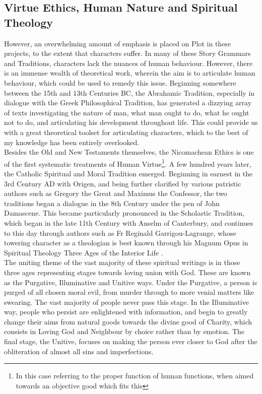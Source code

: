 \documentclass[11pt]{article}
\begin{document}
\subsection{Virtue Ethics, Human Nature and Spiritual Theology}
However, an overwhelming amount of emphasis is placed on Plot in these projects, to the extent that characters suffer. In many of these Story Grammars and Traditions, characters lack the nuances of human behaviour. However, there is an immense wealth of theoretical work, wherein the aim is to articulate human behaviour, which could be used to remedy this issue. Beginning somewhere between the 15th and 13th Centuries BC, the Abrahamic Tradition, especially in dialogue with the Greek Philosophical Tradition, has generated a dizzying array of texts investigating the nature of man, what man ought to do, what he ought not to do, and articulating his development throughout life. This could provide us with a great theoretical toolset for articulating characters, which to the best of my knowledge has been entirely overlooked. \\

Besides the Old and New Testaments themselves, the Nicomachean Ethics \cite{340BCEthicsAristotleNicomachean} is one of the first systematic treatments of Human Virtue\footnote{In this case referring to the proper function of human functions, when aimed towards an objective good which fits this}. A few hundred years later, the Catholic Spiritual and Moral Tradition emerged. Beginning in earnest in the 3rd Century AD with Origen\cite{bergsma2018catholic}, and being further clarified by various patristic authors such as Gregory the Great and Maximus the Confessor, the two traditions began a dialogue in the 8th Century under the pen of John Damascene. This became particularly pronounced in the Scholastic Tradition, which began in the late 11th Century with Anselm of Canterbury, and continues to this day through authors such as Fr Reginald Garrigou-Lagrange, whose towering character as a theologian is best known through his Magnum Opus in Spiritual Theology \: Three Ages of the Interior Life \cite{garrigou2013three}.\\

The uniting theme of the vast majority of these spiritual writings is in those three ages representing stages towards loving union with God. These are known as the Purgative, Illuminative and Unitive ways. Under the Purgative, a person is purged of all chosen moral evil, from murder through to more venial matters like swearing. The vast majority of people never pass this stage. In the Illuminative way, people who persist are enlightened with information, and begin to greatly change their aims from natural goods towards the divine good of Charity, which consists in Loving God and Neighbour by choice rather than by emotion. The final stage, the Unitive, focuses on making the person ever closer to God after the obliteration of almost all sins and imperfections. \\ 
\end{document}
